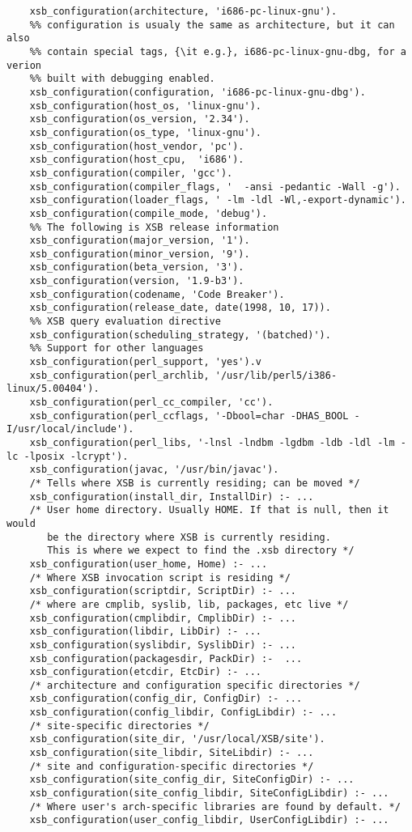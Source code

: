 \begin{description}
\begin{verbatim}
    xsb_configuration(architecture, 'i686-pc-linux-gnu').
    %% configuration is usualy the same as architecture, but it can also
    %% contain special tags, {\it e.g.}, i686-pc-linux-gnu-dbg, for a verion
    %% built with debugging enabled.
    xsb_configuration(configuration, 'i686-pc-linux-gnu-dbg').
    xsb_configuration(host_os, 'linux-gnu').
    xsb_configuration(os_version, '2.34').
    xsb_configuration(os_type, 'linux-gnu').
    xsb_configuration(host_vendor, 'pc').
    xsb_configuration(host_cpu,  'i686').
    xsb_configuration(compiler, 'gcc').
    xsb_configuration(compiler_flags, '  -ansi -pedantic -Wall -g').
    xsb_configuration(loader_flags, ' -lm -ldl -Wl,-export-dynamic').
    xsb_configuration(compile_mode, 'debug').
    %% The following is XSB release information
    xsb_configuration(major_version, '1').
    xsb_configuration(minor_version, '9').
    xsb_configuration(beta_version, '3').
    xsb_configuration(version, '1.9-b3').
    xsb_configuration(codename, 'Code Breaker').
    xsb_configuration(release_date, date(1998, 10, 17)).
    %% XSB query evaluation directive
    xsb_configuration(scheduling_strategy, '(batched)').
    %% Support for other languages
    xsb_configuration(perl_support, 'yes').v
    xsb_configuration(perl_archlib, '/usr/lib/perl5/i386-linux/5.00404').
    xsb_configuration(perl_cc_compiler, 'cc').
    xsb_configuration(perl_ccflags, '-Dbool=char -DHAS_BOOL -I/usr/local/include').
    xsb_configuration(perl_libs, '-lnsl -lndbm -lgdbm -ldb -ldl -lm -lc -lposix -lcrypt').
    xsb_configuration(javac, '/usr/bin/javac').
    /* Tells where XSB is currently residing; can be moved */
    xsb_configuration(install_dir, InstallDir) :- ...
    /* User home directory. Usually HOME. If that is null, then it would
       be the directory where XSB is currently residing.
       This is where we expect to find the .xsb directory */
    xsb_configuration(user_home, Home) :- ...
    /* Where XSB invocation script is residing */
    xsb_configuration(scriptdir, ScriptDir) :- ...
    /* where are cmplib, syslib, lib, packages, etc live */
    xsb_configuration(cmplibdir, CmplibDir) :- ...
    xsb_configuration(libdir, LibDir) :- ...
    xsb_configuration(syslibdir, SyslibDir) :- ...
    xsb_configuration(packagesdir, PackDir) :-  ...
    xsb_configuration(etcdir, EtcDir) :- ...
    /* architecture and configuration specific directories */
    xsb_configuration(config_dir, ConfigDir) :- ...
    xsb_configuration(config_libdir, ConfigLibdir) :- ...
    /* site-specific directories */
    xsb_configuration(site_dir, '/usr/local/XSB/site').
    xsb_configuration(site_libdir, SiteLibdir) :- ...
    /* site and configuration-specific directories */
    xsb_configuration(site_config_dir, SiteConfigDir) :- ...
    xsb_configuration(site_config_libdir, SiteConfigLibdir) :- ...
    /* Where user's arch-specific libraries are found by default. */
    xsb_configuration(user_config_libdir, UserConfigLibdir) :- ...
\end{verbatim}


\end{description}
